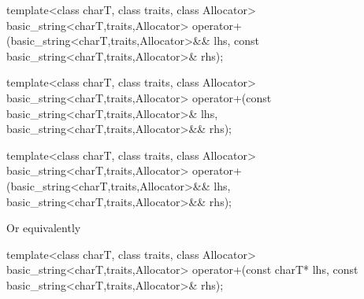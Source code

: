 \begin{itemdescr}
\pnum
\returns
{}
\end{itemdescr}

%
%
\begin{itemdecl}
template<class charT, class traits, class Allocator>
  basic_string<charT,traits,Allocator>
    operator+(basic_string<charT,traits,Allocator>&& lhs,
              const basic_string<charT,traits,Allocator>& rhs);
\end{itemdecl}

\begin{itemdescr}
\pnum
\returns
{}
\end{itemdescr}

%
%
\begin{itemdecl}
template<class charT, class traits, class Allocator>
  basic_string<charT,traits,Allocator>
    operator+(const basic_string<charT,traits,Allocator>& lhs,
              basic_string<charT,traits,Allocator>&& rhs);
\end{itemdecl}

\begin{itemdescr}
\pnum
\returns
{}
\end{itemdescr}

%
%
\begin{itemdecl}
template<class charT, class traits, class Allocator>
  basic_string<charT,traits,Allocator>
    operator+(basic_string<charT,traits,Allocator>&& lhs,
              basic_string<charT,traits,Allocator>&& rhs);
\end{itemdecl}

\begin{itemdescr}
\pnum
\returns
{}
\enternote Or equivalently
 \exitnote
\end{itemdescr}

%
%
\begin{itemdecl}
template<class charT, class traits, class Allocator>
  basic_string<charT,traits,Allocator>
    operator+(const charT* lhs,
              const basic_string<charT,traits,Allocator>& rhs);
\end{itemdecl}

